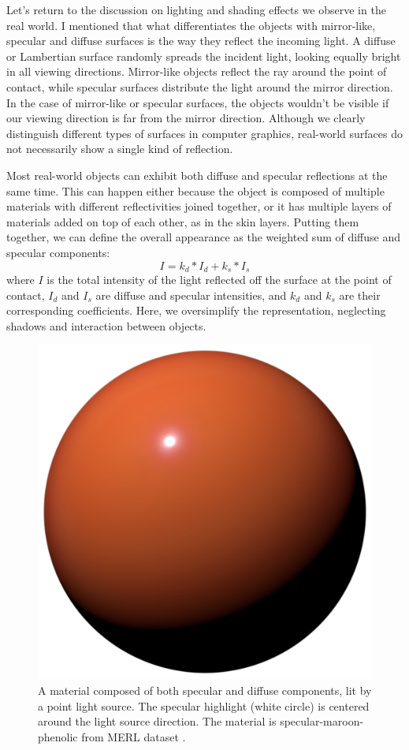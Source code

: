 Let's return to the discussion on lighting and shading effects we observe in the real world. I mentioned that what differentiates the objects with mirror-like,  specular and diffuse surfaces is the way they reflect the incoming light. A diffuse or Lambertian surface randomly spreads the incident light, looking equally bright in all viewing directions. Mirror-like objects reflect the ray around the point of contact, while specular surfaces distribute the light around the mirror direction. In the case of mirror-like or specular surfaces, the objects wouldn't be visible if our viewing direction is far from the mirror direction. Although we clearly distinguish different types of surfaces in computer graphics, real-world surfaces do not necessarily show a single kind of reflection.


Most real-world objects can exhibit both diffuse and specular reflections at the same time. This can happen either because the object is composed of multiple materials with different reflectivities joined together, or it has multiple layers of materials added on top of each other, as in the skin layers. Putting them together, we can define the overall appearance as the weighted sum of diffuse and specular components: 
\begin{equation}
I = k_d * I_d + k_s * I_s
\end{equation}
where $I$ is the total intensity of the light reflected off the surface at the point of contact, $I_d$ and $I_s$  are diffuse and specular intensities, and $k_d$ and $k_s$ are their corresponding coefficients. Here, we oversimplify the representation, neglecting shadows and interaction between objects.



\begin{figure}
  \centering
   \includegraphics[width=0.5\linewidth]{Images/specular+diffuse.png}
   \caption{A material composed of both specular and diffuse components, lit by a point light source. The specular highlight (white circle) is centered around the light source direction. The material is specular-maroon-phenolic from MERL dataset \cite{Matusik2003jul}.}
   \label{fig:diffuse+spec}
\end{figure}


